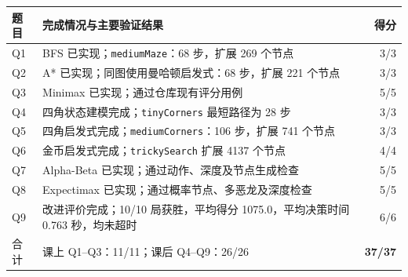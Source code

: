 \documentclass[UTF8,fontset=fandol,a4paper,11pt]{ctexart}
\newcommand{\code}[1]{\texttt{#1}}
\begin{document}
\begin{center}
  \small
  \renewcommand{\arraystretch}{1.22}
  \begin{tabularx}{\linewidth}{@{}p{10mm}Y r@{}}
    \toprule
    题目 & 完成情况与主要验证结果 & 得分 \\
    \midrule
    Q1 & BFS 已实现；\code{mediumMaze}：68 步，扩展 269 个节点 & 3/3 \\
    Q2 & A* 已实现；同图使用曼哈顿启发式：68 步，扩展 221 个节点 & 3/3 \\
    Q3 & Minimax 已实现；通过仓库现有评分用例 & 5/5 \\
    Q4 & 四角状态建模完成；\code{tinyCorners} 最短路径为 28 步 & 3/3 \\
    Q5 & 四角启发式完成；\code{mediumCorners}：106 步，扩展 741 个节点 & 3/3 \\
    Q6 & 金币启发式完成；\code{trickySearch} 扩展 4137 个节点 & 4/4 \\
    Q7 & Alpha-Beta 已实现；通过动作、深度及节点生成检查 & 5/5 \\
    Q8 & Expectimax 已实现；通过概率节点、多恶龙及深度检查 & 5/5 \\
    Q9 & 改进评价完成；10/10 局获胜，平均得分 1075.0，平均决策时间 0.763 秒，均未超时 & 6/6 \\
    \midrule
    合计 & 课上 Q1--Q3：11/11；课后 Q4--Q9：26/26 & \textbf{37/37} \\
    \bottomrule
  \end{tabularx}
\end{center}
\end{document}
